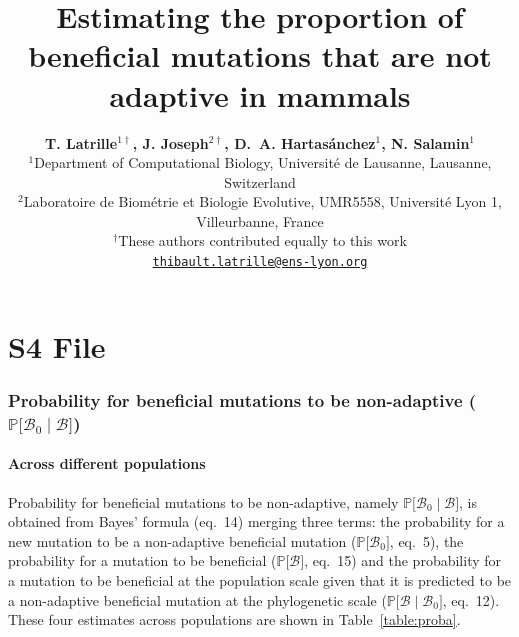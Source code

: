 \documentclass{article}
\title{\textbf{Estimating the proportion of beneficial mutations that are not adaptive in mammals}}
\author{
    \large
    \textbf{T. {Latrille}$^{1\dag}$\orcidlink{0000-0002-9643-4668}, J. {Joseph}$^{2\dag}$\orcidlink{0009-0002-1312-9930}, D.~A. {Hartasánchez}$^{1}$\orcidlink{0000-0003-2596-6883}, N. {Salamin}$^{1}$\orcidlink{0000-0002-3963-4954}}\\
    \scriptsize $^{1}$Department of Computational Biology, Université de Lausanne, Lausanne, Switzerland\\
    \scriptsize $^{2}$Laboratoire de Biométrie et Biologie Evolutive, UMR5558, Université Lyon 1, Villeurbanne, France \\
    \scriptsize $^{\dag}$These authors contributed equally to this work\\
    \normalsize \texttt{\href{mailto:thibault.latrille@ens-lyon.org}{thibault.latrille@ens-lyon.org}} \\
}
\date{}
\newcommand{\proba}{\mathbb{P}}
\newcommand{\SphyBen}{\mathcal{B}_0}
\newcommand{\given}{\mid}
\newcommand{\SpopBen}{\mathcal{B}}
\begin{document}
    \maketitle
    \part*{S4 File}
    \vspace{-1em}
    \tableofcontents
    \listoffigures
    \listoftables
    \clearpage

    \section{Probability for beneficial mutations to be non-adaptive (\texorpdfstring{$\proba{[}\SphyBen\given \SpopBen {]}$}{P[B₀|B]})}

    \subsection{Across different populations}
    Probability for beneficial mutations to be non-adaptive, namely $\proba{[}\SphyBen\given \SpopBen {]}$, is obtained from Bayes' formula (eq.~14) merging three terms: the probability for a new mutation to be a non-adaptive beneficial mutation ($\proba{[} \SphyBen {]}$, eq.~5), the probability for a mutation to be beneficial ($\proba{[} \SpopBen {]}$, eq.~15) and the probability for a mutation to be beneficial at the population scale given that it is predicted to be a non-adaptive beneficial mutation at the phylogenetic scale ($\proba{[} \SpopBen \given \SphyBen{]}$, eq.~12).
    These four estimates across populations are shown in Table~\ref{table:proba}.
\end{document}
